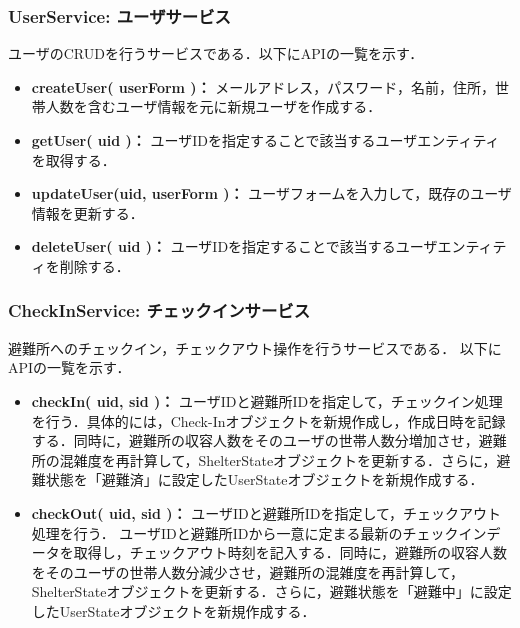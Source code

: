 \documentclass[technicalreport,dvipdfmx]{ieicej}
\begin{document}
\subsubsection{{\bf UserService:} ユーザサービス}
ユーザのCRUDを行うサービスである．以下にAPIの一覧を示す．
\begin{itemize}
    \item{\textbf{createUser( userForm )：}
         メールアドレス，パスワード，名前，住所，世帯人数を含むユーザ情報を元に新規ユーザを作成する．}
    \item{\textbf{getUser( uid )：}
         ユーザIDを指定することで該当するユーザエンティティを取得する．}
    \item{\textbf{updateUser(uid, userForm )：}
         ユーザフォームを入力して，既存のユーザ情報を更新する．}
    \item{\textbf{deleteUser( uid )：}
         ユーザIDを指定することで該当するユーザエンティティを削除する．}
\end{itemize}

\subsubsection{{\bf CheckInService:} チェックインサービス}
避難所へのチェックイン，チェックアウト操作を行うサービスである．
以下にAPIの一覧を示す．
\begin{itemize}
    \item{\textbf{checkIn( uid, sid )：}
         ユーザIDと避難所IDを指定して，チェックイン処理を行う．具体的には，Check-Inオブジェクトを新規作成し，作成日時を記録する．同時に，避難所の収容人数をそのユーザの世帯人数分増加させ，避難所の混雑度を再計算して，ShelterStateオブジェクトを更新する．さらに，避難状態を「避難済」に設定したUserStateオブジェクトを新規作成する．}
    \item{\textbf{checkOut( uid, sid )：}
         ユーザIDと避難所IDを指定して，チェックアウト処理を行う．
         ユーザIDと避難所IDから一意に定まる最新のチェックインデータを取得し，チェックアウト時刻を記入する．同時に，避難所の収容人数をそのユーザの世帯人数分減少させ，避難所の混雑度を再計算して，ShelterStateオブジェクトを更新する．さらに，避難状態を「避難中」に設定したUserStateオブジェクトを新規作成する．}
\end{itemize}

\end{document}
